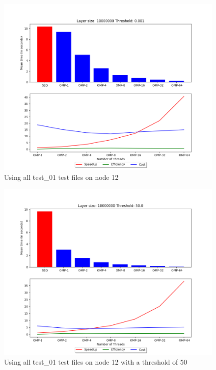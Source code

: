 \begin{figure}[h]
    \centering
    \includegraphics[scale=0.35]{images/plot_node12_all_test_01_ls_10000000.png}
    \caption{Using all test\_01 test files on node 12}
    \label{fig:my_label}
\end{figure}
\begin{figure}[h]
    \centering
    \includegraphics[scale=0.35]{images/plot_node12_all_test_01_ls_10000000_h_50.png}
    \caption{Using all test\_01 test files on node 12 with a threshold of 50}
    \label{fig:my_label}
\end{figure}
